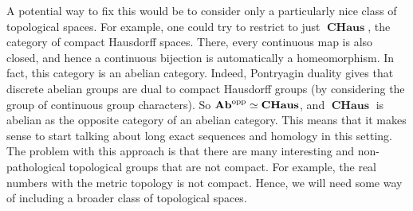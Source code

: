 \documentclass{article}
\DeclareMathOperator{\opp}{opp}
\DeclareMathOperator{\CHaus}{\mathbf{CHaus}}
\begin{document}
A potential way to fix
this would be to consider only a particularly nice
class of topological spaces. For example, one could
try to restrict to just $\CHaus$, the category
of compact Hausdorff spaces. There, every continuous
map is also closed, and hence a continuous bijection
is automatically a homeomorphism. In fact, this
category is an abelian category. Indeed, Pontryagin
duality gives that discrete abelian groups
are dual to compact Hausdorff groups (by considering
the group of continuous group characters). So
$\Ab^{\opp} \simeq \CHaus$, and $\CHaus$ is
abelian as the opposite category of an abelian category.
This means that it makes sense to start talking
about long exact sequences and homology in this
setting.
The problem with
this approach is that there are many interesting
and non-pathological topological
groups that are not compact. For example, the real
numbers with the metric topology is not compact.
Hence, we will need some way of including a
broader class of topological spaces.
\end{document}
